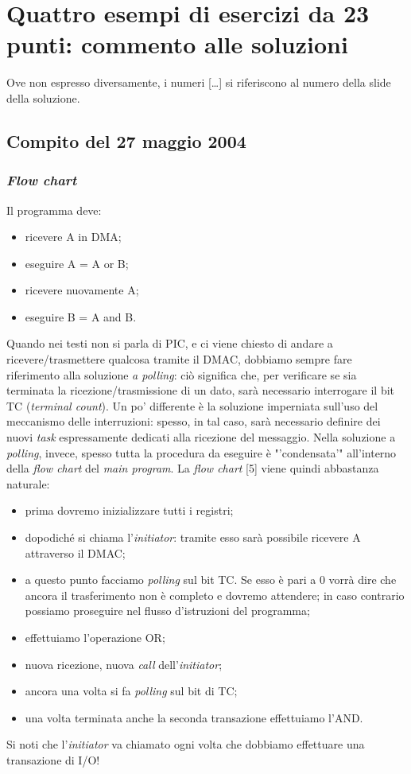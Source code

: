 \chapter{Quattro esempi di esercizi da 23 punti: commento alle soluzioni}
\label{cha:commentoSoluzioni}

Ove non espresso diversamente, i numeri [\ldots] si riferiscono al numero della slide della soluzione.

\section{Compito del 27 maggio 2004}
\label{sec:27mag04}

\subsection{\textit{Flow chart}}

Il programma deve:
\begin{itemize}
\item ricevere A in DMA;
\item eseguire A = A or B;
\item ricevere nuovamente A;
\item eseguire B = A and B.
\end{itemize}
Quando nei testi non si parla di PIC, e ci viene chiesto di andare a ricevere/trasmettere qualcosa tramite il DMAC, dobbiamo sempre fare riferimento alla soluzione \textit{a polling}: ciò significa che, per verificare se sia terminata la ricezione/trasmissione di un dato, sarà necessario interrogare il bit TC (\textit{terminal count}). Un po' differente è la soluzione imperniata sull'uso del meccanismo delle interruzioni: spesso, in tal caso, sarà necessario definire dei nuovi \textit{task} espressamente dedicati alla ricezione del messaggio. Nella soluzione a \textit{polling}, invece, spesso tutta la procedura da eseguire è "'condensata'" all'interno della \textit{flow chart} del \textit{main program}.
La \textit{flow chart} [5] viene quindi abbastanza naturale:
\begin{itemize}
\item prima dovremo inizializzare tutti i registri;
\item dopodiché si chiama l'\textit{initiator}: tramite esso sarà possibile ricevere A attraverso il DMAC;
\item a questo punto facciamo \textit{polling} sul bit TC. Se esso è pari a 0 vorrà dire che ancora il trasferimento non è completo e dovremo attendere; in caso contrario possiamo proseguire nel flusso d'istruzioni del programma; 
\item effettuiamo l'operazione OR;
\item nuova ricezione, nuova \textit{call} dell'\textit{initiator};
\item ancora una volta si fa \textit{polling} sul bit di TC;
\item una volta terminata anche la seconda transazione effettuiamo l'AND.
\end{itemize}
Si noti che l'\textit{initiator} va chiamato ogni volta che dobbiamo effettuare una transazione di I/O!

